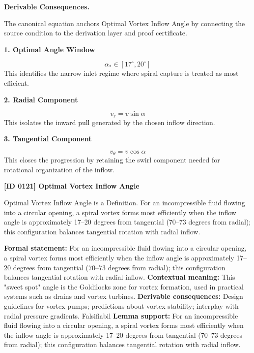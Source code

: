 \par\vspace{0.35em}
\noindent\textbf{Derivable Consequences.}\quad
\begingroup
\footnotesize
\raggedright
The canonical equation anchors Optimal Vortex Inflow Angle by connecting the source condition to the derivation layer and proof certificate.
\par\endgroup

\noindent\textbf{1. Optimal Angle Window}\par
\[
\alpha_{\ast} \in [17^{\circ},20^{\circ}]
\]
\noindent This identifies the narrow inlet regime where spiral capture is treated as most efficient.\par
\noindent\textbf{2. Radial Component}\par
\[
v_r = v\sin\alpha
\]
\noindent This isolates the inward pull generated by the chosen inflow direction.\par
\noindent\textbf{3. Tangential Component}\par
\[
v_\theta = v\cos\alpha
\]
\noindent This closes the progression by retaining the swirl component needed for rotational organization of the inflow.\par

\clearpage
\noindent\textbf{[ID 0121] Optimal Vortex Inflow Angle}\par
\vspace{0.35em}
\begingroup\small
{}
Optimal Vortex Inflow Angle is a Definition. For an incompressible fluid flowing into a circular opening, a spiral vortex forms most efficiently when the inflow angle is approximately 17--20 degrees from tangential (70--73 degrees from radial); this configuration balances tangential rotation with radial inflow.

\begingroup\footnotesize\setlength{\emergencystretch}{3em}\sloppy
\textbf{Formal statement:} For an incompressible fluid flowing into a circular opening, a spiral vortex forms most efficiently when the inflow angle is approximately 17--20 degrees from tangential (70--73 degrees from radial); this configuration balances tangential rotation with radial inflow.
\textbf{Contextual meaning:} This "sweet spot" angle is the Goldilocks zone for vortex formation, used in practical systems such as drains and vortex turbines.
\textbf{Derivable consequences:} Design guidelines for vortex pumps; predictions about vortex stability; interplay with radial pressure gradients. Falsifiabil
\textbf{Lemma support:} For an incompressible fluid flowing into a circular opening, a spiral vortex forms most efficiently when the inflow angle is approximately 17--20 degrees from tangential (70--73 degrees from radial); this configuration balances tangential rotation with radial inflow.\par
\endgroup

